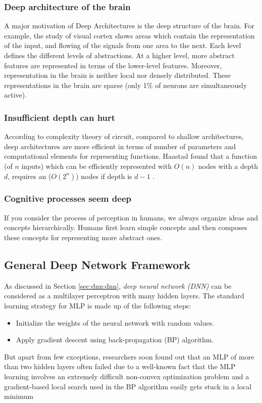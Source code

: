 \subsubsection{Deep architecture of the brain}
A major motivation of Deep Architectures is the deep structure of the brain. For example, the study of visual cortex shows areas which contain the representation of the input, and flowing of the signals from one area to the next. Each level defines the different levels of abstractions. At a higher level, more abstract features are represented in terms of the lower-level features. Moreover, representation in the brain is neither local nor densely distributed. These representations in the brain are sparse (only 1\% of neurons are simultaneously active).

\subsubsection{Insufficient depth can hurt}
According to complexity theory of circuit, compared to shallow architectures, deep architectures are more efficient in terms of number of parameters and computational elements for representing functions\citep{bengio2007scaling}. Haastad found that a function (of $n$ inputs) which can be efficiently represented with $O(n)$ nodes with a depth $d$, requires an ($O(2^n)$) nodes if depth is $d-1$ \citep{bengio2007greedy}.

\subsubsection{Cognitive processes seem deep}
If you consider the process of perception in humans, we always organize ideas and concepts hierarchically. Humans first learn simple concepts and then composes these concepts for representing more abstract ones. 

\subsection{General Deep Network Framework}
As discussed in Section \ref{sec:dnn:dnn}, \textit{deep neural network (DNN)} can be considered as a multilayer perceptron with many hidden layers. The standard learning strategy for MLP is made up of the following steps:\\
\begin{itemize}
\item Initialize the weights of the neural network with random values.
\item Apply gradient descent using back-propagation (BP) algorithm.
\end{itemize}
But apart from few exceptions, researchers soon found out that an MLP of more than two hidden layers often failed \cite{bengio2007greedy} due to a well-known fact that the MLP learning involves an extremely difficult non-convex optimization problem and a gradient-based local search used in
the BP algorithm easily gets stuck in a local minimum 

